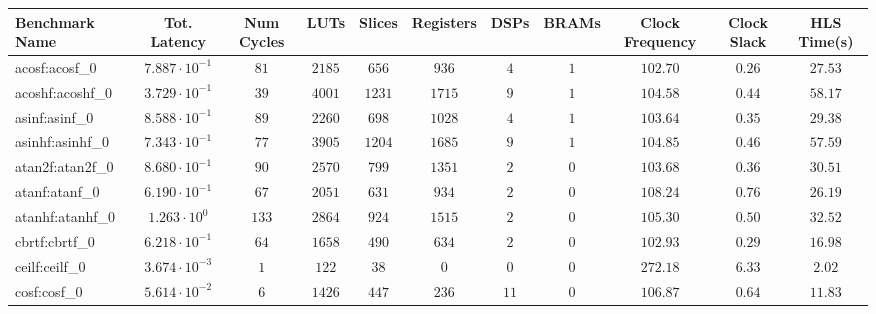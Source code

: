 \begin{tabular}{|l|c|c|c|c|c|c|c|c|c|c|}
\hline
Benchmark Name               & Tot. Latency            & Num Cycles & LUTs      & Slices    & Registers & DSPs    & BRAMs & Clock Frequency & Clock Slack & HLS Time(s) \\
\hline
acosf:acosf\_0               & $ 7.887 \cdot 10^{-1} $ & $ 81     $ & $ 2185  $ & $ 656   $ & $ 936   $ & $ 4   $ & $ 1 $ & $ 102.70      $ & $ 0.26    $ & $ 27.53   $ \\
acoshf:acoshf\_0             & $ 3.729 \cdot 10^{-1} $ & $ 39     $ & $ 4001  $ & $ 1231  $ & $ 1715  $ & $ 9   $ & $ 1 $ & $ 104.58      $ & $ 0.44    $ & $ 58.17   $ \\
asinf:asinf\_0               & $ 8.588 \cdot 10^{-1} $ & $ 89     $ & $ 2260  $ & $ 698   $ & $ 1028  $ & $ 4   $ & $ 1 $ & $ 103.64      $ & $ 0.35    $ & $ 29.38   $ \\
asinhf:asinhf\_0             & $ 7.343 \cdot 10^{-1} $ & $ 77     $ & $ 3905  $ & $ 1204  $ & $ 1685  $ & $ 9   $ & $ 1 $ & $ 104.85      $ & $ 0.46    $ & $ 57.59   $ \\
atan2f:atan2f\_0             & $ 8.680 \cdot 10^{-1} $ & $ 90     $ & $ 2570  $ & $ 799   $ & $ 1351  $ & $ 2   $ & $ 0 $ & $ 103.68      $ & $ 0.36    $ & $ 30.51   $ \\
atanf:atanf\_0               & $ 6.190 \cdot 10^{-1} $ & $ 67     $ & $ 2051  $ & $ 631   $ & $ 934   $ & $ 2   $ & $ 0 $ & $ 108.24      $ & $ 0.76    $ & $ 26.19   $ \\
atanhf:atanhf\_0             & $ 1.263 \cdot 10^{0}  $ & $ 133    $ & $ 2864  $ & $ 924   $ & $ 1515  $ & $ 2   $ & $ 0 $ & $ 105.30      $ & $ 0.50    $ & $ 32.52   $ \\
cbrtf:cbrtf\_0               & $ 6.218 \cdot 10^{-1} $ & $ 64     $ & $ 1658  $ & $ 490   $ & $ 634   $ & $ 2   $ & $ 0 $ & $ 102.93      $ & $ 0.29    $ & $ 16.98   $ \\
ceilf:ceilf\_0               & $ 3.674 \cdot 10^{-3} $ & $ 1      $ & $ 122   $ & $ 38    $ & $ 0     $ & $ 0   $ & $ 0 $ & $ 272.18      $ & $ 6.33    $ & $ 2.02    $ \\
cosf:cosf\_0                 & $ 5.614 \cdot 10^{-2} $ & $ 6      $ & $ 1426  $ & $ 447   $ & $ 236   $ & $ 11  $ & $ 0 $ & $ 106.87      $ & $ 0.64    $ & $ 11.83   $ \\

\end{tabular}
